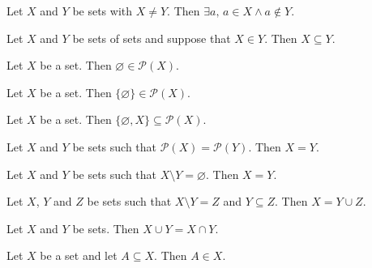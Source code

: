 \begin{chapex} %
Let $X$ and $Y$ be sets with $X \ne Y$. Then $\exists a,\, a \in X \wedge a \not\in Y$.
\end{chapex}

\begin{chapex} %
Let $X$ and $Y$ be sets of sets and suppose that $X \in Y$. Then $X \subseteq Y$.
\end{chapex}

\begin{chapex} %
Let $X$ be a set. Then $\varnothing \in \mathcal{P}(X)$.
\end{chapex}

\begin{chapex} %
Let $X$ be a set. Then $\{ \varnothing \} \in \mathcal{P}(X)$.
\end{chapex}

\begin{chapex} %
Let $X$ be a set. Then $\{ \varnothing, X \} \subseteq \mathcal{P}(X)$.
\end{chapex}

\begin{chapex} %
Let $X$ and $Y$ be sets such that $\mathcal{P}(X) = \mathcal{P}(Y)$. Then $X = Y$.
\end{chapex}

\begin{chapex} %
Let $X$ and $Y$ be sets such that $X \setminus Y = \varnothing$. Then $X = Y$.
\end{chapex}

\begin{chapex} %
Let $X$, $Y$ and $Z$ be sets such that $X \setminus Y = Z$ and $Y \subseteq Z$. Then $X = Y \cup Z$.
\end{chapex}

\begin{chapex} %
Let $X$ and $Y$ be sets. Then $X \cup Y = X \cap Y$.
\end{chapex}

\begin{chapex} %
\label{cqSetsASNEnd}
Let $X$ be a set and let $A \subseteq X$. Then $A \in X$.
\end{chapex}